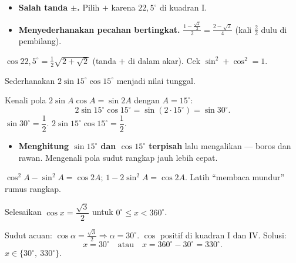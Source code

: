 \begin{jebakan}
\begin{itemize}[leftmargin=*,topsep=2pt]
  \item \textbf{Salah tanda $\pm$.} Pilih $+$ karena $22{,}5^\circ$ di kuadran I.
  \item \textbf{Menyederhanakan pecahan bertingkat.} $\frac{1-\frac{\sqrt2}{2}}{2}
  =\frac{2-\sqrt2}{4}$ (kali $\frac22$ dulu di pembilang).
\end{itemize}
\end{jebakan}

\begin{variasi}
$\cos22{,}5^\circ=\frac12\sqrt{2+\sqrt2}$ (tanda $+$ di dalam akar). Cek
$\sin^2+\cos^2=1$.
\end{variasi}

\begin{soalbox}{}
Sederhanakan $2\sin15^\circ\cos15^\circ$ menjadi nilai tunggal.
\end{soalbox}

\jawab
{} Kenali pola $2\sin A\cos A=\sin2A$ dengan $A=15^\circ$:
\[
2\sin15^\circ\cos15^\circ=\sin(2\cdot15^\circ)=\sin30^\circ.
\]
 $\sin30^\circ=\dfrac12$.
\jadi $2\sin15^\circ\cos15^\circ=\dfrac12$.

\begin{jebakan}
\begin{itemize}[leftmargin=*,topsep=2pt]
  \item \textbf{Menghitung $\sin15^\circ$ dan $\cos15^\circ$ terpisah} lalu
  mengalikan --- boros dan rawan. Mengenali pola sudut rangkap jauh lebih cepat.
\end{itemize}
\end{jebakan}

\begin{variasi}
$\cos^2 A-\sin^2 A=\cos2A$; $1-2\sin^2 A=\cos2A$. Latih ``membaca mundur'' rumus
rangkap.
\end{variasi}

\begin{soalbox}{}
Selesaikan $\cos x=\dfrac{\sqrt3}{2}$ untuk $0^\circ\le x<360^\circ$.
\end{soalbox}

\jawab
{} Sudut acuan: $\cos\alpha=\frac{\sqrt3}{2}\Rightarrow\alpha=30^\circ$.
 $\cos$ positif di kuadran I dan IV. Solusi:
\[
x=30^\circ \quad\text{atau}\quad x=360^\circ-30^\circ=330^\circ.
\]
\jadi $x\in\{30^\circ,\ 330^\circ\}$.

